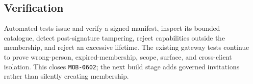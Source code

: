 \subsection{Verification}

Automated tests issue and verify a signed manifest, inspect its bounded catalogue,
detect post-signature tampering, reject capabilities outside the membership, and reject
an excessive lifetime.  The existing gateway tests continue to prove wrong-person,
expired-membership, scope, surface, and cross-client isolation.  This closes
\texttt{MOB-0602}; the next build stage adds governed invitations rather than silently
creating membership.

